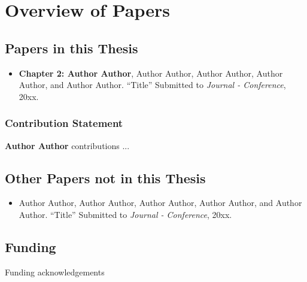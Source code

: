 \chapter*{Overview of Papers}

\section*{Papers in this Thesis}
\begin{itemize}
    \item{\textbf{Chapter 2: Author Author}}, Author Author, Author Author, Author Author, and Author Author. ``Title'' Submitted to \textit{Journal - Conference}, 20xx.
   
\end{itemize}

\subsection*{Contribution Statement}

\textbf{Author Author} contributions ...


\section*{Other Papers not in this Thesis}

\begin{itemize}
    \item Author Author, Author Author, Author Author, Author Author, and Author Author. ``Title'' Submitted to \textit{Journal - Conference}, 20xx.
\end{itemize}
\section*{Funding}

Funding acknowledgements 

